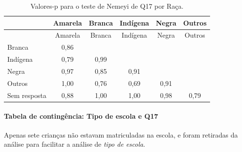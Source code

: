 \documentclass[]{article}
\let\oldparagraph\paragraph
\renewcommand{\paragraph}[1]{\oldparagraph{#1}\mbox{}}
\begin{document}
\begin{longtable}[]{@{}lccccc@{}}
\caption{\label{tab:unnamed-chunk-229}Valores-p para o teste de Nemeyi de Q17 por Raça.}\tabularnewline
\toprule
& Amarela & Branca & Indígena & Negra & Outros\tabularnewline
\midrule
\endfirsthead
\toprule
& Amarela & Branca & Indígena & Negra & Outros\tabularnewline
\midrule
\endhead
Branca & 0,86 & & & &\tabularnewline
Indígena & 0,79 & 0,99 & & &\tabularnewline
Negra & 0,97 & 0,85 & 0,91 & &\tabularnewline
Outros & 1,00 & 0,76 & 0,69 & 0,91 &\tabularnewline
Sem resposta & 0,88 & 1,00 & 1,00 & 0,98 & 0,79\tabularnewline
\bottomrule
\end{longtable}

\cleardoublepage

\hypertarget{tabela-de-continguxeancia-tipo-de-escola-e-q17}{%
\paragraph{Tabela de contingência: Tipo de escola e Q17}\label{tabela-de-continguxeancia-tipo-de-escola-e-q17}}

Apenas sete crianças não estavam matriculadas na escola, e foram retiradas da análise para facilitar a análise de \emph{tipo de escola}.
\end{document}
